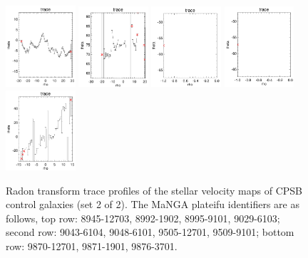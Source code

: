 \documentclass[fleqn,usenatbib]{mnras}
\begin{document}
\begin{figure}
    \includegraphics[width=0.23\textwidth]{Images/trace-plots/trace-plots-cpsb-controls/9505-12701.png}   
    \includegraphics[width=0.23\textwidth]{Images/trace-plots/trace-plots-cpsb-controls/9509-9101.png}
    \includegraphics[width=0.23\textwidth]{Images/trace-plots/trace-plots-cpsb-controls/9870-12701.png}
    \includegraphics[width=0.23\textwidth]{Images/trace-plots/trace-plots-cpsb-controls/9871-1901.png}    
    \includegraphics[width=0.23\textwidth]{Images/trace-plots/trace-plots-cpsb-controls/9876-3701.png}
    \caption{Radon transform trace profiles of the stellar velocity maps of CPSB control galaxies (set 2 of 2). The MaNGA plateifu identifiers are as follows, top row: 8945-12703, 8992-1902, 8995-9101, 9029-6103; second row: 9043-6104, 9048-6101, 9505-12701, 9509-9101; bottom row: 9870-12701, 9871-1901, 9876-3701.}
    \label{fig:Radon-traces-CPSB-controls-2}
\end{figure}
\end{document}
